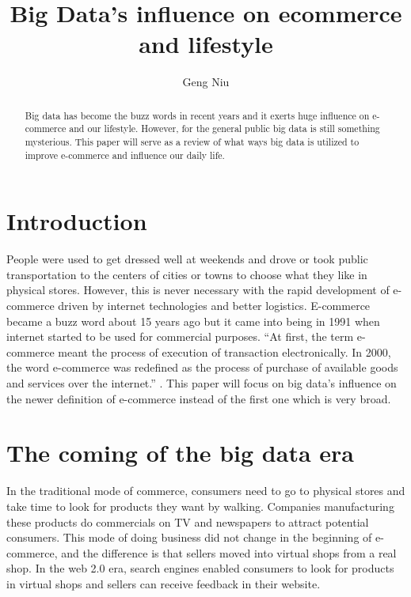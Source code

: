 \documentclass[sigconf]{acmart}
\begin{document}
\title{Big Data's influence on ecommerce and lifestyle}


\author{Geng Niu}



\begin{abstract}
Big data has become the buzz words in recent years and it exerts huge influence on e-commerce and our lifestyle. However, for the general public big data is still something mysterious. This paper will serve as a review of what ways big data is utilized to improve e-commerce and influence our daily life.
\end{abstract}



\maketitle

\section{Introduction}
People were used to get dressed well at weekends and drove or took public transportation to the centers of cities or towns to choose what they like in physical stores. However, this is never necessary with the rapid development of e-commerce driven by internet technologies and better logistics.  E-commerce became a buzz word about 15 years ago but it came into being in 1991 when internet started to be used for commercial purposes. ``At first, the term e-commerce meant the process of execution of transaction electronically. In 2000, the word e-commerce was redefined as the process of purchase of available goods and services over the internet.'' \cite{HistoryofEcommerce}. This paper will focus on big data’s influence on the newer definition of e-commerce instead of the first one which is very broad.
\section{The coming of the big data era}
In the traditional mode of commerce, consumers need to go to physical stores and take time to look for products they want by walking. Companies manufacturing these products do commercials on TV and newspapers to attract potential consumers. This mode of doing business did not change in the beginning of e-commerce, and the difference is that sellers moved into virtual shops from a real shop. In the web 2.0 era, search engines enabled consumers to look for products in virtual shops and sellers can receive feedback in their website\cite{Chen2012}.
\end{document}
